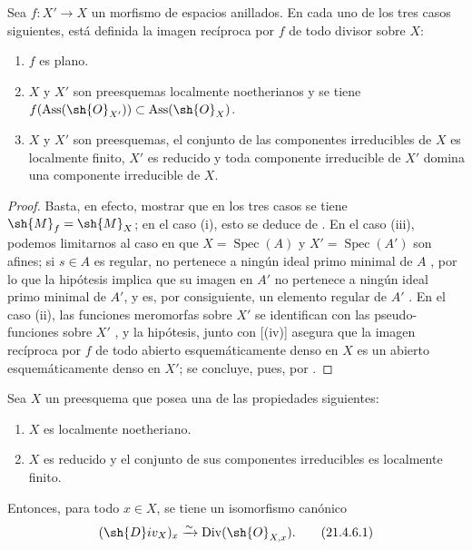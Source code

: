 \begin{proposition}[21.4.5]
\label{IV.21.4.5}
Sea $f:X'\to X$ un morfismo de espacios anillados.
En cada uno de los tres casos siguientes, está definida la imagen recíproca por $f$ de todo divisor sobre $X$:
\begin{enumerate}[label=\textup{(\roman*)}]
  \item $f$ es plano.
  \item $X$ y $X'$ son preesquemas localmente noetherianos y se tiene $f(\operatorname{Ass}(\sh{O}_{X'}))\subset\operatorname{Ass}(\sh{O}_X)$.
  \item $X$ y $X'$ son preesquemas, el conjunto de las componentes irreducibles de $X$ es localmente finito, $X'$ es reducido y toda componente irreducible de $X'$ domina una componente irreducible de $X$.
\end{enumerate}
\end{proposition}

\begin{proof}
Basta, en efecto, mostrar que en los tres casos se tiene $\sh{M}_f=\sh{M}_X$;
en el caso (i), esto se deduce de .
En el caso (iii), podemos limitarnos al caso en que $X=\operatorname{Spec}(A)$ y $X'=\operatorname{Spec}(A')$ son afines;
si $s\in A$ es regular, no pertenece a ningún ideal primo minimal de $A$ , por lo que la hipótesis implica que su imagen en $A'$ no pertenece a ningún ideal primo minimal de $A'$, y es, por consiguiente, un elemento regular de $A'$ .
En el caso (ii), las funciones meromorfas sobre $X'$ se identifican con las pseudo-funciones sobre $X'$ , y la hipótesis, junto con [(iv)] asegura que la imagen recíproca
por $f$ de todo abierto esquemáticamente denso en $X$ es un abierto esquemáticamente denso en $X'$;
se concluye, pues, por .
\end{proof}

\begin{corollary}[21.4.6]
\label{IV.21.4.6}
Sea $X$ un preesquema que posea una de las propiedades siguientes:
\begin{enumerate}[label=\textup{(\roman*)}]
  \item $X$ es localmente noetheriano.
  \item $X$ es reducido y el conjunto de sus componentes irreducibles es localmente finito.
\end{enumerate}
Entonces, para todo $x\in X$, se tiene un isomorfismo canónico
\[
\label{IV.21.4.6.1}
  (\sh{D}iv_X)_x\xrightarrow{\sim}\operatorname{Div}(\sh{O}_{X,x}).
  \tag{21.4.6.1}
\]
\end{corollary}

